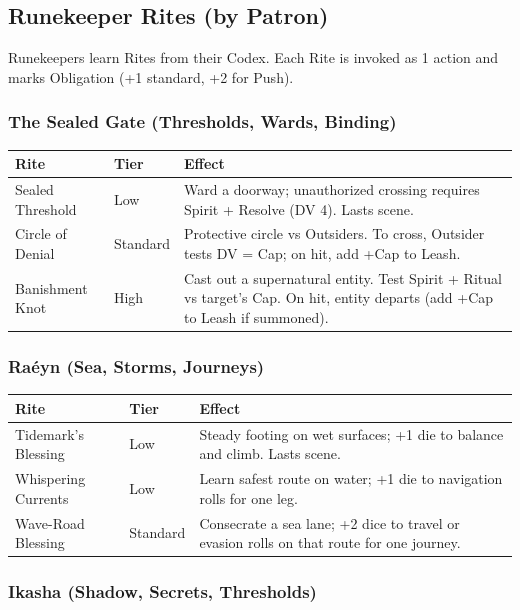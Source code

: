 \subsection{Runekeeper Rites (by Patron)}

Runekeepers learn Rites from their Codex. Each Rite is invoked as 1 action and marks Obligation (+1 standard, +2 for Push).

\subsubsection{The Sealed Gate (Thresholds, Wards, Binding)}

\begin{tabular}{@{}l>{\raggedright\arraybackslash}p{3cm}>{\raggedright\arraybackslash}p{7cm}@{}}
\toprule
\textbf{Rite} & \textbf{Tier} & \textbf{Effect} \\
\midrule
Sealed Threshold & Low & Ward a doorway; unauthorized crossing requires Spirit + Resolve (DV 4). Lasts scene. \\
Circle of Denial & Standard & Protective circle vs Outsiders. To cross, Outsider tests DV = Cap; on hit, add +Cap to Leash. \\
Banishment Knot & High & Cast out a supernatural entity. Test Spirit + Ritual vs target's Cap. On hit, entity departs (add +Cap to Leash if summoned). \\
\bottomrule
\end{tabular}

\subsubsection{Ra\'eyn (Sea, Storms, Journeys)}

\begin{tabular}{@{}l>{\raggedright\arraybackslash}p{3cm}>{\raggedright\arraybackslash}p{7cm}@{}}
\toprule
\textbf{Rite} & \textbf{Tier} & \textbf{Effect} \\
\midrule
Tidemark's Blessing & Low & Steady footing on wet surfaces; +1 die to balance and climb. Lasts scene. \\
Whispering Currents & Low & Learn safest route on water; +1 die to navigation rolls for one leg. \\
Wave-Road Blessing & Standard & Consecrate a sea lane; +2 dice to travel or evasion rolls on that route for one journey. \\
\bottomrule
\end{tabular}

\subsubsection{Ikasha (Shadow, Secrets, Thresholds)}

